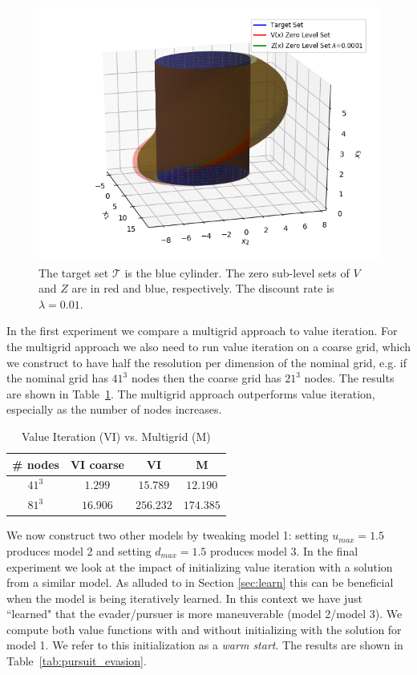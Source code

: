 \begin{figure}
\includegraphics[trim= 2.5cm 0cm 0cm 0.5cm, clip=true,scale=0.65]{air_3D.png}
\caption{The target set $\mathcal{T}$ is the blue cylinder. The zero sub-level sets of $V$ and $Z$ are in red and blue, respectively. The discount rate is $\lambda=0.01$.}
\label{fig:air3D}
\end{figure}

In the first experiment we compare a multigrid approach{} to value iteration. For the multigrid approach we also need to run value iteration on a coarse grid, which we construct to have half the resolution per dimension of the nominal grid, e.g. if the nominal grid has $41^3$ nodes then the coarse grid has $21^3$ nodes. The results are shown in Table~\ref{tab:multigrid}. The multigrid approach outperforms value iteration, especially as the number of nodes increases.

\begin{table}
\centering
\caption{Value Iteration (VI) vs. Multigrid (M)}
\label{tab:multigrid}
\begin{tabular}{|c| c| c| c| }
\hline
\# nodes &  VI coarse & VI & M \\ \hline
$41^3$ &$1.299$ &$15.789$  & $12.190$ \\ \hline
$81^3$ &$16.906$&$256.232$  & $174.385$ \\ \hline
\end{tabular}
\end{table}

We now construct two other models by tweaking model 1: setting $u_{max}=1.5$ produces model 2 and setting $d_{max}=1.5$ produces model 3. In the final experiment we look at the impact of initializing value iteration with a solution from a similar model. As alluded to in Section \ref{sec:learn} this can be beneficial when the model is being iteratively learned. In this context we have just ``learned" that the evader/pursuer is more maneuverable (model 2/model 3). We compute both value functions with and without initializing with the solution for model 1. We refer to this initialization as a \emph{warm start}. The results are shown in Table~\ref{tab:pursuit_evasion}.

